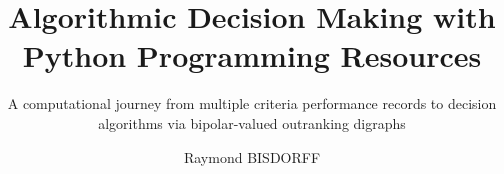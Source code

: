 \documentclass[12pt,envcountchap,sectrefs,english]{svmono}
\begin{document}
\author{Raymond BISDORFF}
\title{Algorithmic Decision Making with Python Programming Resources}
\subtitle{A computational journey from multiple criteria performance records to decision algorithms via bipolar-valued outranking digraphs}
\maketitle

\frontmatter%




\tableofcontents

%

\mainmatter%
\setlength{\tabcolsep}{0.5em}
\lstset{style=pythonstyle}


       



























\end{document}
